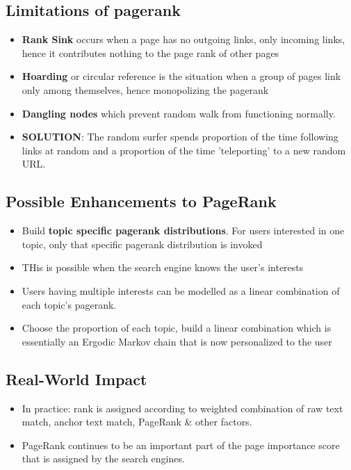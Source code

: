\documentclass{article}
\begin{document}
\subsection{Limitations of pagerank}
\begin{itemize}
    \item \textbf{Rank Sink} occurs when a page has no outgoing links, only incoming links, hence it contributes nothing to the page rank of other pages
    
    \item \textbf{Hoarding} or circular reference is the situation when a group of pages link only among themselves, hence monopolizing the pagerank
    
    \item \textbf{Dangling nodes} which prevent random walk from functioning normally.
    
    \item \textbf{SOLUTION}: The random surfer spends proportion of the time following links at random and a proportion of the time 'teleporting' to a new random  URL.
\end{itemize}

\subsection{Possible Enhancements to PageRank}
\begin{itemize}
    \item Build \textbf{topic specific pagerank distributions}. For users interested in one topic, only that specific pagerank distribution is invoked
    
    \item THis is possible when the search engine knows the user's interests
    
    \item Users having multiple interests can be modelled as a linear combination of each topic's pagerank. 
    
    \item Choose the proportion of each topic, build a linear combination which is essentially an Ergodic Markov chain that is now personalized to the user
\end{itemize}

\subsection{Real-World Impact}
\begin{itemize}
    \item In practice: rank is assigned according to weighted combination of raw text match, anchor text match, PageRank \& other factors.
    
    \item PageRank continues to be an important part of the page importance score that is assigned by the search engines. 
\end{itemize}
\end{document}
